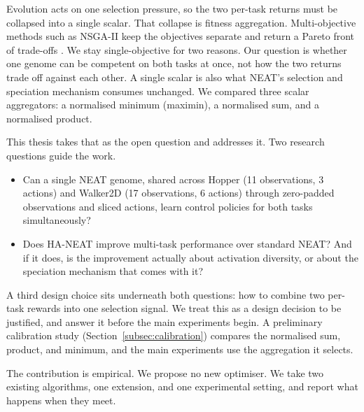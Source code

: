 \documentclass[12pt]{article}
\newcommand{\revPlain}[2]{#2}
\begin{document}
Evolution acts on one selection pressure, so the two per-task returns must be collapsed into a single scalar. That collapse is fitness aggregation.
Multi-objective methods such as NSGA-II keep the objectives separate and return a Pareto front of trade-offs \parencite{deb_fast_2002}.
We stay single-objective for two reasons. Our question is whether one genome can be competent on both tasks at once, not how the two returns trade off against each other. A single scalar is also what NEAT's selection and speciation mechanism consumes unchanged.
We compared three scalar aggregators: a normalised minimum (maximin), a normalised sum, and a normalised product.



\revPlain{P-02}{This thesis takes that as the open question and addresses it.}
\revPlain{P-03}{Two research questions guide the work.}
\begin{itemize}
    \item Can a single NEAT genome, shared across Hopper (11 observations, 3 actions) and Walker2D (17 observations, 6 actions) through zero-padded observations and sliced actions, learn control policies for both tasks simultaneously?
    \item Does HA-NEAT improve multi-task performance over standard NEAT? And if it does, is the improvement actually about activation diversity, or about the speciation mechanism that comes with it?
\end{itemize}
A third design choice sits underneath both questions: how to combine two per-task rewards into one selection signal.
We treat this as a design decision to be justified, and answer it before the main experiments begin.
A preliminary calibration study (Section~\ref{subsec:calibration}) compares the normalised sum, product, and minimum, and the main experiments use the aggregation it selects.

The contribution is empirical.
We propose no new optimiser. We take two existing algorithms, one extension, and one experimental setting, and report what happens when they meet.
\end{document}
